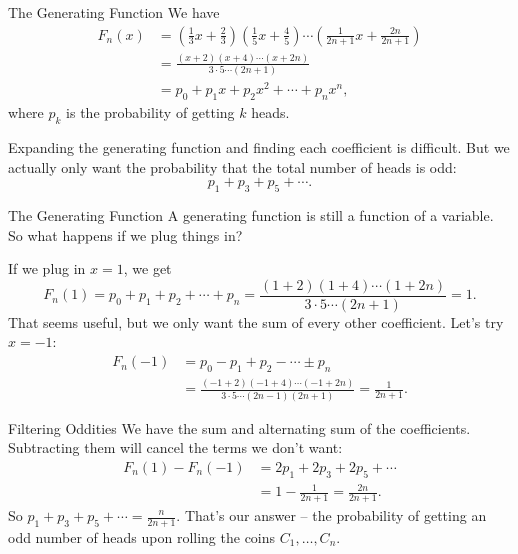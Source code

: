 \documentclass[aspectratio=169]{beamer}
\begin{document}
\begin{frame}{The Generating Function}
  We have
  \begin{align*}
    F_n(x) &= \left( \frac{1}{3}x + \frac{2}{3} \right) \left( \frac{1}{5}x + \frac{4}{5} \right)
    \cdots \left( \frac{1}{2n+1}x + \frac{2n}{2n+1} \right) \\
    &= \frac{(x+2) (x+4) \cdots (x+2n)}{3 \cdot 5 \cdots (2n+1)} \\
    &= p_0 + p_1 x + p_2 x^2 + \cdots + p_n x^n,
  \end{align*}
  where $p_k$ is the probability of getting $k$ heads.
  \pause
  
  Expanding the generating function and finding each coefficient is difficult.
  But we actually only want the probability that the total number of heads is odd:
  \[ p_1 + p_3 + p_5 + \cdots .\]
\end{frame}

\begin{frame}{The Generating Function}
  A generating function is still a function of a variable. So what happens if we plug things in?
  \pause
  
  If we plug in $x = 1$, we get
  \[ F_n(1) = p_0 + p_1 + p_2 + \cdots + p_n
  = \frac{(1+2)(1+4) \cdots (1+2n)}{3 \cdot 5 \cdots (2n+1)}
  = 1.\]
  \pause
  That seems useful, but we only want the sum of every other coefficient.
  Let's try $x = -1$:
  \begin{align*} F_n(-1) &= p_0 - p_1 + p_2 - \cdots \pm p_n \\
  &= \frac{(-1+2)(-1+4) \cdots (-1+2n)}{3 \cdot 5 \cdots (2n-1) (2n+1)}
  = \frac{1}{2n+1}.
  \end{align*}
\end{frame}

\begin{frame}{Filtering Oddities}
  We have the sum and alternating sum of the coefficients.
  Subtracting them will cancel the terms we don't want:
  \begin{align*}
    F_n(1) - F_n(-1)
    &= 2p_1 + 2p_3 + 2p_5 + \cdots \\
    &= 1 - \frac{1}{2n+1} = \frac{2n}{2n+1}.
  \end{align*}
  \pause
  So $p_1 + p_3 + p_5 + \cdots = \frac{n}{2n+1}$.
  That's our answer -- the probability of getting an odd number of heads upon rolling the coins $C_1, \dots, C_n$.
\end{frame}
\end{document}
